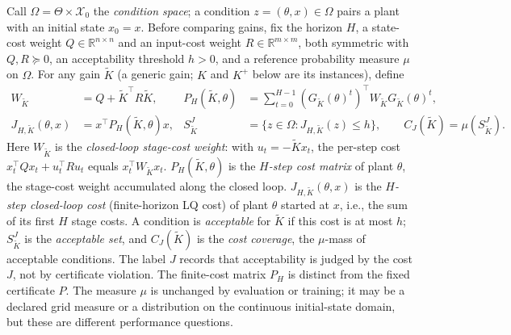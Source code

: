 \begin{definition}
\label{def:stage2_performance}
Call $\Omega=\Theta\times\mathcal X_0$ the \emph{condition space}; a
condition $z=(\theta,x)\in\Omega$ pairs a plant with an initial state
$x_0=x$. Before comparing gains, fix the horizon $H$, a state-cost weight
$Q\in\mathbb R^{n\times n}$ and an input-cost weight
$R\in\mathbb R^{m\times m}$, both symmetric with $Q,R\succeq0$, an
acceptability threshold $h>0$, and a reference probability measure $\mu$
on $\Omega$. For any gain $\widetilde K$ (a generic gain; $K$ and $K^+$
below are its instances), define
\begin{align}
\label{eq:stage2_cost_matrix}
 W_{\widetilde K}&=Q+\widetilde K^\top R\widetilde K,
 &P_H(\widetilde K,\theta)
 &=\sum_{t=0}^{H-1}(G_{\widetilde K}(\theta)^t)^\top
       W_{\widetilde K}G_{\widetilde K}(\theta)^t,\\
\label{eq:stage2_cost_coverage}
 J_{H,\widetilde K}(\theta,x)&=x^\top P_H(\widetilde K,\theta)x,
 &S_{\widetilde K}^J&=\{z\in\Omega:J_{H,\widetilde K}(z)\le h\},
 \qquad C_J(\widetilde K)=\mu(S_{\widetilde K}^J).
\end{align}
Here $W_{\widetilde K}$ is the \emph{closed-loop stage-cost weight}:
with $u_t=-\widetilde Kx_t$, the per-step cost
$x_t^\top Qx_t+u_t^\top Ru_t$ equals $x_t^\top W_{\widetilde K}x_t$.
$P_H(\widetilde K,\theta)$ is the \emph{$H$-step cost matrix} of plant
$\theta$, the stage-cost weight accumulated along the closed loop.
$J_{H,\widetilde K}(\theta,x)$ is the \emph{$H$-step closed-loop cost}
(finite-horizon LQ cost) of plant $\theta$ started at $x$, i.e., the sum
of its first $H$ stage costs. A condition is \emph{acceptable} for
$\widetilde K$ if this cost is at most $h$; $S_{\widetilde K}^J$ is the
\emph{acceptable set}, and $C_J(\widetilde K)$ is the \emph{cost
coverage}, the $\mu$-mass of acceptable conditions. The label $J$ records
that acceptability is judged by the cost $J$, not by certificate violation.
The finite-cost matrix $P_H$ is distinct from the fixed certificate $P$.
The measure $\mu$ is unchanged by evaluation or training; it may be a
declared grid measure or a distribution on the continuous initial-state
domain, but these are different performance questions.
\end{definition}

